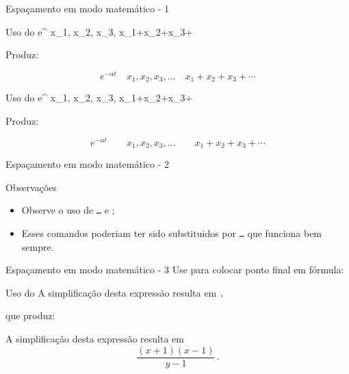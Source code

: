 \begin{frame}{Espaçamento em modo matemático - 1}
	\begin{Codigo}{Uso do }
		\LCmd{[}e\string^  x\string_1, x\string_2, x\string_3,   x\string_1+x\string_2+x\string_3+
	\end{Codigo}
	
	\pause
	Produz:
	
	\begin{Resultado}{}
		\[e^{-\alpha t} \quad x_1, x_2, x_3, \dots \quad x_1+x_2+x_3+\cdots
\]
	\end{Resultado}

    \pause
	\begin{Codigo}{Uso do }
		\LCmd{[}e\string^  x\string_1, x\string_2, x\string_3,   x\string_1+x\string_2+x\string_3+
	\end{Codigo}

    \pause
	Produz:

	\begin{Resultado}{}
		\[e^{-\alpha t} \qquad x_1, x_2, x_3, \dots \qquad x_1+x_2+x_3+\cdots
\]
	\end{Resultado}
\end{frame}

\begin{frame}{Espaçamento em modo matemático - 2}
	\begin{Observacao}{Observações}
		\begin{itemize}
			\item Observe o uso de \texttt{\string\ldots} e \texttt{\string\cdots};
			\item Esses comandos poderiam ter sido substituidos por \texttt{\string\dots} que funciona bem sempre.
		\end{itemize}
	\end{Observacao}
\end{frame}

\begin{frame}{Espaçamento em modo matemático - 3}
	Use \LCmd{,} para colocar ponto final em fórmula:

	\begin{Codigo}{Uso do \LCmd{,}}
		A simplificação desta expressão resulta em\n
		\texttt{\LCmd{[}\LCmd{,}.\LCmd{]}}
	\end{Codigo}
	
	\pause
	que produz:
	
	\begin{Resultado}{}
		A simplificação desta expressão resulta em
			\[\frac{(x+1)(x-1)}{y-1}\, .\]
	\end{Resultado}
\end{frame}

